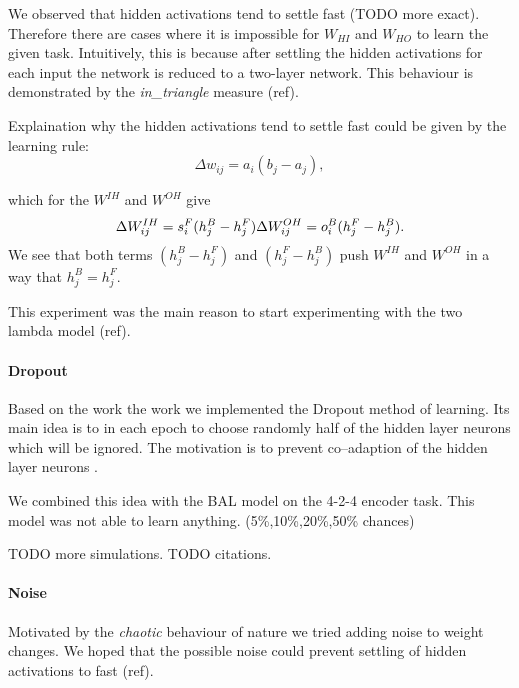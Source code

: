 We observed that hidden activations tend to settle fast (TODO more exact). Therefore there are cases where it is impossible for $W_{HI}$ and $W_{HO}$ to learn the given task. Intuitively, this is because after settling the hidden activations for each input the network is reduced to a two-layer network. This behaviour is demonstrated by the \emph{in\_triangle} measure (ref). 

Explaination why the hidden activations tend to settle fast could be given by the learning rule: 
\begin{equation} 
\Delta w_{ij} = a_i(b_j - a_j),
\end{equation} 

which for the $W^{IH}$ and $W^{OH}$ give
\begin{equation} 
\Delta W^{IH}_{ij} = s^F_i(h^B_j - h^F_j) \\ 
\Delta W^{OH}_{ij} = o^B_i(h^F_j - h^B_j). 
\end{equation} 
We see that both terms $(h^B_j - h^F_j)$ and $(h^F_j - h^B_j)$ push $W^{IH}$ and $W^{OH}$ in a way that $h^B_j = h^F_j$. 

This experiment was the main reason to start experimenting with the two lambda model (ref). 

\paragraph{Dropout}
Based on the work the work \citet{hinton2012improving} we implemented the Dropout method of learning. Its main idea is to in each epoch to choose randomly half of the hidden layer neurons which will be ignored. The motivation is to prevent co--adaption of the hidden layer neurons \citep{hinton2012improving}. 

We combined this idea with the BAL model on the 4-2-4 encoder task. This model was not able to learn anything. 
(5\%,10\%,20\%,50\% chances)

TODO more simulations. 
TODO citations.  

\paragraph{Noise} 

Motivated by the \emph{chaotic} behaviour of nature we tried adding noise to weight changes. We hoped that the possible noise could prevent settling of hidden activations to fast (ref). 

